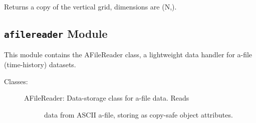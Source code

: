 \documentclass[letterpaper,10pt,english]{sphinxmanual}
\begin{document}
\begin{fulllineitems}
\begin{fulllineitems}
\end{fulllineitems}


\begin{fulllineitems}
\label{eqtools:eqtools.FromArrays.ArrayEquilibrium.getZGrid}
Returns a copy of the vertical grid, dimensions are (N,).

\end{fulllineitems}


\end{fulllineitems}



\subsection{\texttt{afilereader} Module}
\label{eqtools:afilereader-module}\label{eqtools:module-eqtools.afilereader}
This module contains the AFileReader class, a lightweight data
handler for a-file (time-history) datasets.
\begin{description}
\item[{Classes:}] \leavevmode\begin{description}
\item[{AFileReader: Data-storage class for a-file data.  Reads}] \leavevmode
data from ASCII a-file, storing as copy-safe object
attributes.

\end{description}

\end{description}
\end{document}
